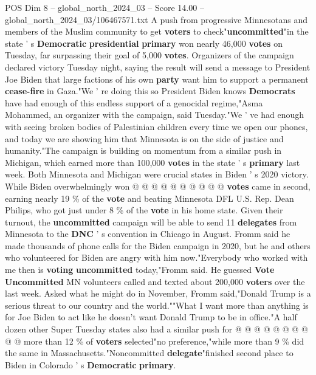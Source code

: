 \begin{textsample}{POS Dim 8 – global\_north\_2024\_03 – Score 14.00 – global\_north\_2024\_03/106467571.txt}  \label{ex:f8_pos_003}
A push from progressive Minnesotans and members of the Muslim community to get \textbf{voters} to check"\textbf{uncommitted}"in the state ' s \textbf{Democratic} \textbf{presidential} \textbf{primary} won nearly 46,000 \textbf{votes} on Tuesday, far surpassing their goal of 5,000 \textbf{votes}.
Organizers of the campaign declared victory Tuesday night, saying the result will send a message to President Joe Biden that large factions of his own \textbf{party} want him to support a permanent \textbf{cease-fire} in Gaza."We ' re doing this so President Biden knows \textbf{Democrats} have had enough of this endless support of a genocidal regime,"Asma Mohammed, an organizer with the campaign, said Tuesday."We ' ve had enough with seeing broken bodies of Palestinian children every time we open our phones, and today we are showing him that Minnesota is on the side of justice and humanity."The campaign is building on momentum from a similar push in Michigan, which earned more than 100,000 \textbf{votes} in the state ' s \textbf{primary} last week.
Both Minnesota and Michigan were crucial states in Biden ' s 2020 victory.
While Biden overwhelmingly won @ @ @ @ @ @ @ @ @ @ \textbf{votes} came in second, earning nearly 19 \% of the \textbf{vote} and beating Minnesota DFL U.S.
Rep.
Dean Philips, who got just under 8 \% of the \textbf{vote} in his home state.
Given their turnout, the \textbf{uncommitted} campaign will be able to send 11 \textbf{delegates} from Minnesota to the \textbf{DNC} ' s convention in Chicago in August.
Fromm said he made thousands of phone calls for the Biden campaign in 2020, but he and others who volunteered for Biden are angry with him now."Everybody who worked with me then is \textbf{voting} \textbf{uncommitted} today,"Fromm said.
He guessed \textbf{Vote} \textbf{Uncommitted} MN volunteers called and texted about 200,000 \textbf{voters} over the last week.
Asked what he might do in November, Fromm said,"Donald Trump is a serious threat to our country and the world.""What I want more than anything is for Joe Biden to act like he doesn't want Donald Trump to be in office."A half dozen other Super Tuesday states also had a similar push for @ @ @ @ @ @ @ @ @ @ more than 12 \% of \textbf{voters} selected"no preference,"while more than 9 \% did the same in Massachusetts."Noncommitted \textbf{delegate}"finished second place to Biden in Colorado ' s \textbf{Democratic} \textbf{primary}.

\end{textsample}
